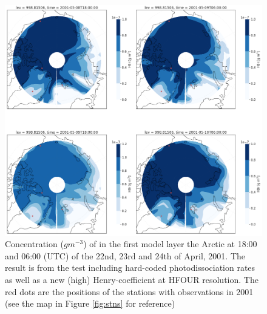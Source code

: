 \begin{figure}[h]
    \centering
    \includegraphics[width=\linewidth]{Chapter6_Results/images/Polar_StationComp_2001/HBr/polarHBr_step4.png}
    \caption{Concentration ($g m^{-3}$) of  in the first model layer the Arctic at 18:00 and 06:00 (UTC) of the 22nd, 23rd and 24th of April, 2001. The result is from the test including hard-coded photodissociation rates as well as a new (high) Henry-coefficient at HFOUR resolution. The red dots are the positions of the stations with observations in 2001 (see the map in Figure \ref{fig:stns} for reference)}
    \label{fig:polarHBr_step4}
\end{figure}